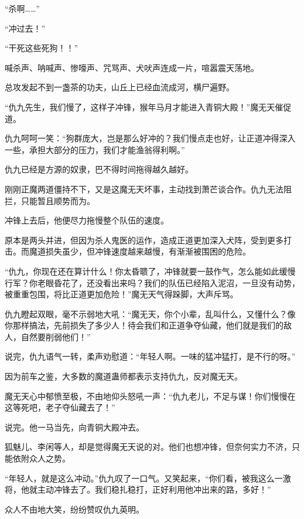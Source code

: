 
\begin{this_body}

“杀啊……”

“冲过去！”

“干死这些死狗！！”

喊杀声、呐喊声、惨嚎声、咒骂声、犬吠声连成一片，喧嚣震天荡地。

总攻发起不到一盏茶的功夫，山丘上已经血流成河，横尸遍野。

“仇九先生，我们慢了，这样子冲锋，猴年马月才能进入青铜大殿！”魔无天催促道。

仇九呵呵一笑：“狗群庞大，岂是那么好冲的？我们慢点走也好，让正道冲得深入一些，承担大部分的压力，我们才能渔翁得利啊。”

仇九已经是方源的奴隶，巴不得时间拖得越久越好。

刚刚正魔两道僵持不下，又是这魔无天坏事，主动找到萧芒谈合作。仇九无法阻拦，只能暂且顺势而为。

冲锋上去后，他便尽力拖慢整个队伍的速度。

原本是两头并进，但因为杀人鬼医的运作，造成正道更加深入犬阵，受到更多打击。而魔道损失虽少，但冲锋速度越来越慢，有渐渐被围困的危险。

“仇九，你现在还在算计什么！你太昏聩了，冲锋就要一鼓作气，怎么能如此缓慢行军？你老眼昏花了，还没看出来吗？我们的队伍已经陷入泥沼，一旦没有动势，被重重包围，将比正道更加危险！”魔无天气得跺脚，大声斥骂。

仇九瞪起双眼，毫不示弱地大吼：“魔无天，你个小辈，乱叫什么，又懂什么？像你那样搞法，先前损失了多少人！待会我们和正道争夺仙藏，他们就是我们的敌人，自然要削弱他们！”

说完，仇九语气一转，柔声劝慰道：“年轻人啊。一味的猛冲猛打，是不行的呀。”

因为前车之鉴，大多数的魔道蛊师都表示支持仇九，反对魔无天。

魔无天心中郁愤至极，不由地仰头怒吼一声：“仇九老儿，不足与谋！你们慢慢在这等死吧，老子夺仙藏去了！”

说完。他一马当先，向青铜大殿冲去。

狐魅儿、李闲等人，却是觉得魔无天说的对。他们也想冲锋，但奈何实力不济，只能依附众人之势。

“年轻人，就是这么冲动。”仇九叹了一口气。又笑起来，“你们看，被我这么一激将，他就主动冲锋去了。我们稳扎稳打，正好利用他冲出来的路，多好！”

众人不由地大笑，纷纷赞叹仇九英明。


\end{this_body}
